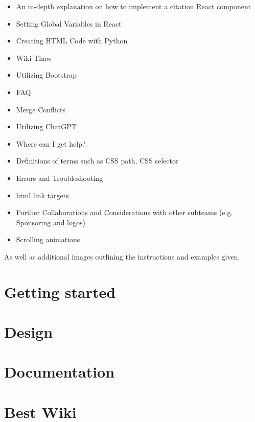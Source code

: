 \documentclass[a4paper, 11pt, twoside]{book}
\begin{document}
\begin{itemize}
    \item An in-depth explanation on how to implement a citation React component
    \item Setting Global Variables in React
    \item Creating HTML Code with Python
    \item Wiki Thaw
    \item Utilizing Bootstrap
    \item FAQ
    \item Merge Conflicts
    \item Utilizing ChatGPT
    \item Where can I get help?
    \item Definitions of terms such as CSS path, CSS selector
    \item Errors and Troubleshooting
    \item html link targets
    \item Further Collaborations and Considerations with other subteams (e.g. Sponsoring and logos)
    \item Scrolling animations
\end{itemize}
As well as additional images outlining the instructions and examples given.
\newpage

\mainmatter
\pagecolor{pgcolor}
\chapter{Getting started} \label{sec:started}
%
\newpage
\chapter{Design} \label{sec:design}
%
\newpage
\chapter{Documentation} \label{sec:docu}
%
\newpage
%
\chapter{Best Wiki} \label{sec:bestwiki}
%
\newpage
\end{document}
